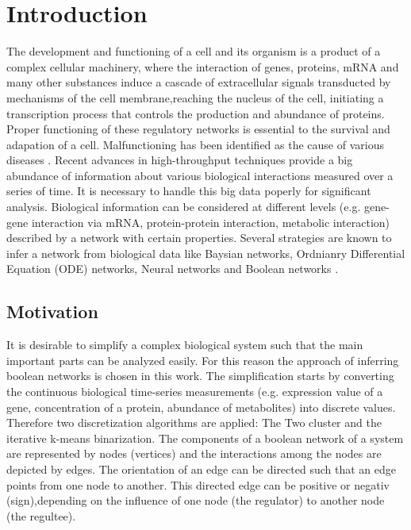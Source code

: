 \chapter{Introduction}
The development and functioning of a cell and its organism is a product of a complex cellular machinery, where the interaction of genes, proteins, mRNA and many other substances induce a cascade of extracellular signals transducted by mechanisms of the cell membrane,reaching the nucleus of the cell, initiating a transcription process that controls the production and abundance of proteins. Proper functioning of these regulatory networks is essential to the survival and adapation of a cell. Malfunctioning has been identified as the cause of various diseases 
\cite{10.1371/journal.pone.0066031}.
Recent advances in high-throughput techniques provide a big abundance of information about various biological interactions measured over a series of time. It is necessary to handle this big data poperly for significant analysis.
Biological information can be considered at different levels (e.g. gene-gene interaction via mRNA, protein-protein interaction, metabolic interaction) described by a network with certain properties. Several strategies are known to infer a network from biological data like Baysian networks, Ordnianry Differential Equation (ODE) networks, Neural networks and  Boolean networks \cite{SAADATPOUR20133}.

\section{Motivation}
It is desirable to simplify a complex biological system such that the main important parts can be analyzed easily. For this reason the approach of inferring boolean networks is chosen in this work. The simplification starts by converting the continuous biological time-series measurements (e.g. expression value of a gene, concentration of a protein, abundance of metabolites) into discrete values. Therefore two discretization algorithms are applied: The Two cluster and the  iterative k-means binarization.
The components of a boolean network of a system are represented by nodes (vertices) and the interactions among the nodes are depicted by edges. The orientation of an edge can be directed such that an edge points from one node to another. This directed edge can be positive or negativ (sign),depending on the influence of one node (the regulator) to another node (the regultee). 
\citep{SAADATPOUR20133}\\

